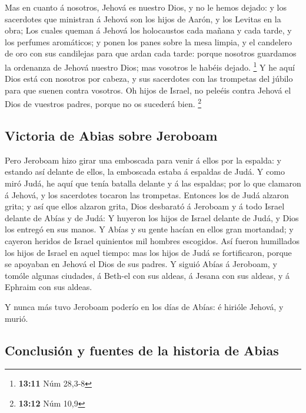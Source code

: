  Mas en cuanto á nosotros, Jehová es nuestro Dios, y no
le hemos dejado: y los sacerdotes que ministran á Jehová son los hijos
de Aarón, y los Levitas en la obra;  Los cuales queman á
Jehová los holocaustos cada mañana y cada tarde, y los perfumes
aromáticos; y ponen los panes sobre la mesa limpia, y el candelero de
oro con sus candilejas para que ardan cada tarde: porque nosotros
guardamos la ordenanza de Jehová nuestro Dios; mas vosotros le habéis
dejado. \footnote{\textbf{13:11} Núm 28,3-8}  Y he aquí
Dios está con nosotros por cabeza, y sus sacerdotes con las trompetas
del júbilo para que suenen contra vosotros. Oh hijos de Israel, no
peleéis contra Jehová el Dios de vuestros padres, porque no os sucederá
bien. \footnote{\textbf{13:12} Núm 10,9}

\hypertarget{victoria-de-abias-sobre-jeroboam}{%
\subsection{Victoria de Abias sobre
Jeroboam}\label{victoria-de-abias-sobre-jeroboam}}

 Pero Jeroboam hizo girar una emboscada para venir á
ellos por la espalda: y estando así delante de ellos, la emboscada
estaba á espaldas de Judá.  Y como miró Judá, he aquí que
tenía batalla delante y á las espaldas; por lo que clamaron á Jehová, y
los sacerdotes tocaron las trompetas.  Entonces los de
Judá alzaron grita; y así que ellos alzaron grita, Dios desbarató á
Jeroboam y á todo Israel delante de Abías y de Judá:  Y
huyeron los hijos de Israel delante de Judá, y Dios los entregó en sus
manos.  Y Abías y su gente hacían en ellos gran
mortandad; y cayeron heridos de Israel quinientos mil hombres escogidos.
 Así fueron humillados los hijos de Israel en aquel
tiempo: mas los hijos de Judá se fortificaron, porque se apoyaban en
Jehová el Dios de sus padres.  Y siguió Abías á Jeroboam,
y tomóle algunas ciudades, á Beth-el con sus aldeas, á Jesana con sus
aldeas, y á Ephraim con sus aldeas.

 Y nunca más tuvo Jeroboam poderío en los días de Abías:
é hirióle Jehová, y murió.

\hypertarget{conclusiuxf3n-y-fuentes-de-la-historia-de-abias}{%
\subsection{Conclusión y fuentes de la historia de
Abias}\label{conclusiuxf3n-y-fuentes-de-la-historia-de-abias}}

